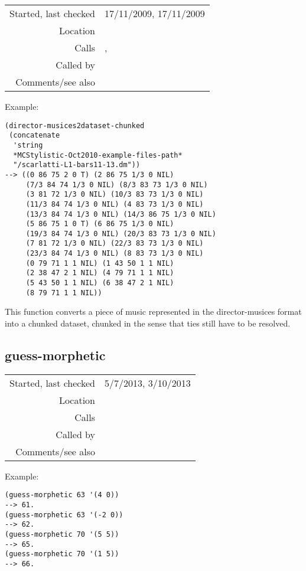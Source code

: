 \vspace{0.3cm}
\begin{tabular}{r|p{8cm}}
Started, last checked & 17/11/2009, 17/11/2009 \\
Location & \nameref{sec:director-musices} \\
Calls & \nameref{fun:director-musice2datapoint}, \nameref{fun:read-from-file} \\
Called by & \nameref{fun:director-musices2dataset} \\
Comments/see also &
\end{tabular}

\vspace{0.5cm}
\noindent Example:
\begin{verbatim}
(director-musices2dataset-chunked
 (concatenate
  'string
  *MCStylistic-Oct2010-example-files-path*
  "/scarlatti-L1-bars11-13.dm"))
--> ((0 86 75 2 0 T) (2 86 75 1/3 0 NIL)
     (7/3 84 74 1/3 0 NIL) (8/3 83 73 1/3 0 NIL)
     (3 81 72 1/3 0 NIL) (10/3 83 73 1/3 0 NIL)
     (11/3 84 74 1/3 0 NIL) (4 83 73 1/3 0 NIL)
     (13/3 84 74 1/3 0 NIL) (14/3 86 75 1/3 0 NIL)
     (5 86 75 1 0 T) (6 86 75 1/3 0 NIL)
     (19/3 84 74 1/3 0 NIL) (20/3 83 73 1/3 0 NIL)
     (7 81 72 1/3 0 NIL) (22/3 83 73 1/3 0 NIL)
     (23/3 84 74 1/3 0 NIL) (8 83 73 1/3 0 NIL)
     (0 79 71 1 1 NIL) (1 43 50 1 1 NIL)
     (2 38 47 2 1 NIL) (4 79 71 1 1 NIL)
     (5 43 50 1 1 NIL) (6 38 47 2 1 NIL)
     (8 79 71 1 1 NIL))
\end{verbatim}

\noindent This function converts a piece of music
represented in the director-musices format into a
chunked dataset, chunked in the sense that ties still
have to be resolved.


\subsection*{guess-morphetic}\label{fun:guess-morphetic}

\vspace{0.3cm}
\begin{tabular}{r|p{8cm}}
Started, last checked & 5/7/2013, 3/10/2013 \\
Location & \nameref{sec:director-musices} \\
Calls & \nameref{fun:guess-morphetic-in-C-major} \\
Called by & \\
Comments/see also & 
\end{tabular}

\vspace{0.5cm}
\noindent Example:
\begin{verbatim}
(guess-morphetic 63 '(4 0))
--> 61.
(guess-morphetic 63 '(-2 0))
--> 62.
(guess-morphetic 70 '(5 5))
--> 65.
(guess-morphetic 70 '(1 5))
--> 66.
\end{verbatim}

